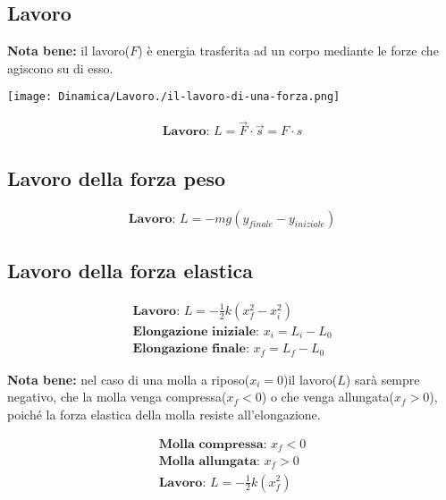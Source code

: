 \subsection{Lavoro}

\textbf{Nota bene: } il lavoro($F$) è energia trasferita ad un corpo mediante le forze che agiscono su di esso. \\
\begin{center}
    \texttt{[image: Dinamica/Lavoro./il-lavoro-di-una-forza.png]}    
\end{center}
\begin{gather*}
    \textbf{Lavoro: } L = \vec{F} \cdot \vec{s} = F \cdot  s
\end{gather*}

\subsection{Lavoro della forza peso}

\begin{gather*}
    \textbf{Lavoro: } L = -mg(y_{finale} - y_{iniziale})
\end{gather*}

\subsection{Lavoro della forza elastica}

\begin{gather*}
    \textbf{Lavoro: } L = - \frac{1}{2} k (x_f^2 - x_i^2) \\
    \textbf{Elongazione iniziale: } x_i = L_i - L_0 \\
    \textbf{Elongazione finale: } x_f = L_f - L_0
\end{gather*}

\textbf{Nota bene: } nel caso di una molla a riposo($x_i = 0$)il lavoro($L$) sarà sempre negativo, che la molla venga compressa($x_f < 0$) o che venga allungata($x_f > 0$), poiché la forza elastica della molla resiste all'elongazione.

\begin{gather*}
    \textbf{Molla compressa: } x_f < 0 \\
    \textbf{Molla allungata: } x_f > 0 \\
    \textbf{Lavoro: } L = - \frac{1}{2} k (x_f^2)
\end{gather*}